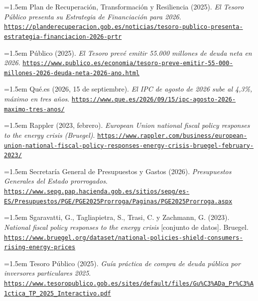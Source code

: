 \documentclass[10pt,a4paper]{article}
\begin{document}
\noindent\hangindent=1.5em Plan de Recuperación, Transformación y Resiliencia (2025). \textit{El Tesoro Público presenta su Estrategia de Financiación para 2026}. \href{https://planderecuperacion.gob.es/noticias/tesoro-publico-presenta-estrategia-financiacion-2026-prtr}{\nolinkurl{https://planderecuperacion.gob.es/noticias/tesoro-publico-presenta-estrategia-financiacion-2026-prtr}}

\noindent\hangindent=1.5em Público (2025). \textit{El Tesoro prevé emitir 55.000 millones de deuda neta en 2026}. \href{https://www.publico.es/economia/tesoro-preve-emitir-55-000-millones-2026-deuda-neta-2026-ano.html}{\nolinkurl{https://www.publico.es/economia/tesoro-preve-emitir-55-000-millones-2026-deuda-neta-2026-ano.html}}

\noindent\hangindent=1.5em Qué.es (2026, 15 de septiembre). \textit{El IPC de agosto de 2026 sube al 4,3\%, máximo en tres años}. \href{https://www.que.es/2026/09/15/ipc-agosto-2026-maximo-tres-anos/}{\nolinkurl{https://www.que.es/2026/09/15/ipc-agosto-2026-maximo-tres-anos/}}

\noindent\hangindent=1.5em Rappler (2023, febrero). \textit{European Union national fiscal policy responses to the energy crisis (Bruegel)}. \href{https://www.rappler.com/business/european-union-national-fiscal-policy-responses-energy-crisis-bruegel-february-2023/}{\nolinkurl{https://www.rappler.com/business/european-union-national-fiscal-policy-responses-energy-crisis-bruegel-february-2023/}}

\noindent\hangindent=1.5em Secretaría General de Presupuestos y Gastos (2026). \textit{Presupuestos Generales del Estado prorrogados}. \href{https://www.sepg.pap.hacienda.gob.es/sitios/sepg/es-ES/Presupuestos/PGE/PGE2025Prorroga/Paginas/PGE2025Prorroga.aspx}{\nolinkurl{https://www.sepg.pap.hacienda.gob.es/sitios/sepg/es-ES/Presupuestos/PGE/PGE2025Prorroga/Paginas/PGE2025Prorroga.aspx}}

\noindent\hangindent=1.5em Sgaravatti, G., Tagliapietra, S., Trasi, C. y Zachmann, G. (2023). \textit{National fiscal policy responses to the energy crisis} [conjunto de datos]. Bruegel. \href{https://www.bruegel.org/dataset/national-policies-shield-consumers-rising-energy-prices}{\nolinkurl{https://www.bruegel.org/dataset/national-policies-shield-consumers-rising-energy-prices}}

\noindent\hangindent=1.5em Tesoro Público (2025). \textit{Guía práctica de compra de deuda pública por inversores particulares 2025}. \href{https://www.tesoropublico.gob.es/sites/default/files/Gu\%C3\%ADa_Pr\%C3\%A1ctica_TP_2025_Interactivo.pdf}{\nolinkurl{https://www.tesoropublico.gob.es/sites/default/files/Gu\%C3\%ADa_Pr\%C3\%A1ctica_TP_2025_Interactivo.pdf}}
\end{document}
